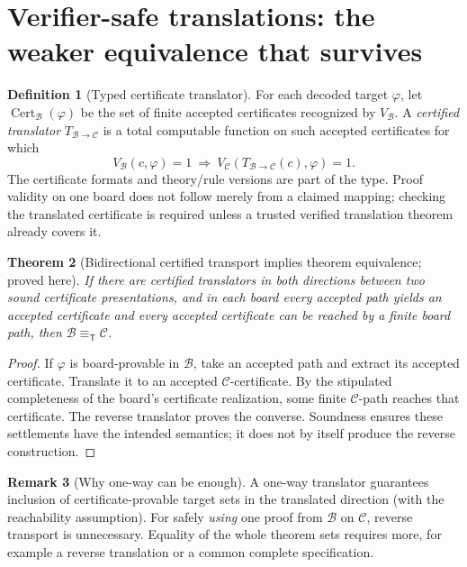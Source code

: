 \documentclass[11pt,letterpaper]{article}
\newtheorem{theorem}{Theorem}[section]
\theoremstyle{definition}
\newtheorem{definition}[theorem]{Definition}
\newtheorem{remark}[theorem]{Remark}
\newcommand{\Cert}{\operatorname{Cert}}
\newcommand{\B}{\mathcal B}
\newcommand{\T}{\mathsf T}
\newcommand{\eqT}{\equiv_{\T}}
\begin{document}
\section{Verifier-safe translations: the weaker equivalence that survives}
\begin{definition}[Typed certificate translator]\label{def:translator}
For each decoded target $\varphi$, let $\Cert_\B(\varphi)$ be the set of finite accepted certificates recognized by $V_\B$. A \emph{certified translator} $T_{\B\to\mathcal C}$ is a total computable function on such accepted certificates for which
\[
V_\B(c,\varphi)=1\ \Longrightarrow\ V_{\mathcal C}(T_{\B\to\mathcal C}(c),\varphi)=1.
\]
The certificate formats and theory/rule versions are part of the type. Proof validity on one board does not follow merely from a claimed mapping; checking the translated certificate is required unless a trusted verified translation theorem already covers it.
\end{definition}
\begin{theorem}[Bidirectional certified transport implies theorem equivalence; proved here]\label{thm:twoWay}
If there are certified translators in both directions between two sound certificate presentations, and in each board every accepted path yields an accepted certificate and every accepted certificate can be reached by a finite board path, then $\B\eqT\mathcal C$.
\end{theorem}
\begin{proof}
If $\varphi$ is board-provable in $\B$, take an accepted path and extract its accepted certificate. Translate it to an accepted $\mathcal C$-certificate. By the stipulated completeness of the board's certificate realization, some finite $\mathcal C$-path reaches that certificate. The reverse translator proves the converse. Soundness ensures these settlements have the intended semantics; it does not by itself produce the reverse construction.
\end{proof}
\begin{remark}[Why one-way can be enough]
A one-way translator guarantees inclusion of certificate-provable target sets in the translated direction (with the reachability assumption). For safely \emph{using} one proof from $\B$ on $\mathcal C$, reverse transport is unnecessary. Equality of the whole theorem sets requires more, for example a reverse translation or a common complete specification.
\end{remark}
\end{document}
